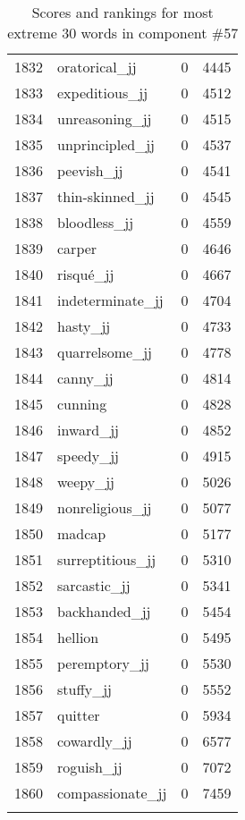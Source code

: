 \begin{longtable}[!htbp]{| rlr@{.}l |}
    1832 & oratorical\_jj & 0 & 4445 \\
    1833 & expeditious\_jj & 0 & 4512 \\
    1834 & unreasoning\_jj & 0 & 4515 \\
    1835 & unprincipled\_jj & 0 & 4537 \\
    1836 & peevish\_jj & 0 & 4541 \\
    1837 & thin-skinned\_jj & 0 & 4545 \\
    1838 & bloodless\_jj & 0 & 4559 \\
    1839 & carper & 0 & 4646 \\
    1840 & risqué\_jj & 0 & 4667 \\
    1841 & indeterminate\_jj & 0 & 4704 \\
    1842 & hasty\_jj & 0 & 4733 \\
    1843 & quarrelsome\_jj & 0 & 4778 \\
    1844 & canny\_jj & 0 & 4814 \\
    1845 & cunning & 0 & 4828 \\
    1846 & inward\_jj & 0 & 4852 \\
    1847 & speedy\_jj & 0 & 4915 \\
    1848 & weepy\_jj & 0 & 5026 \\
    1849 & nonreligious\_jj & 0 & 5077 \\
    1850 & madcap & 0 & 5177 \\
    1851 & surreptitious\_jj & 0 & 5310 \\
    1852 & sarcastic\_jj & 0 & 5341 \\
    1853 & backhanded\_jj & 0 & 5454 \\
    1854 & hellion & 0 & 5495 \\
    1855 & peremptory\_jj & 0 & 5530 \\
    1856 & stuffy\_jj & 0 & 5552 \\
    1857 & quitter & 0 & 5934 \\
    1858 & cowardly\_jj & 0 & 6577 \\
    1859 & roguish\_jj & 0 & 7072 \\
    1860 & compassionate\_jj & 0 & 7459 \\
    \hline
    \caption{Scores and rankings for most extreme 30 words in component \#57} \\
\end{longtable}
